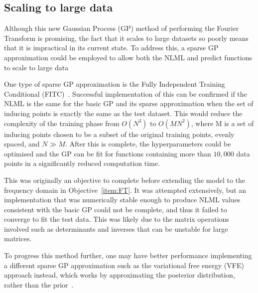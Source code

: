 \documentclass[12pt]{article}
\begin{document}
    \subsection{Scaling to large data}
    Although this new Gaussian Process (GP) method of performing the Fourier Transform is promising, the fact that it scales to large datasets so poorly means that it is impractical in its current state.
    To address this, a sparse GP approximation could be employed to allow both the NLML and predict functions to scale to large data

    One type of sparse GP approximation is the Fully Independent Training Conditional (FITC)~\cite{q-candela}.
    Successful implementation of this can be confirmed if the NLML is the same for the basic GP and its sparse approximation when the set of inducing points is exactly the same as the test dataset.
    This would reduce the complexity of the training phase from $O(N^3)$ to $O(MN^2)$, where M is a set of inducing points chosen to be a subset of the original training points, evenly spaced, and $N \gg M$. 
    After this is complete, the hyperparameters could be optimised and the GP can be fit for functions containing more than $10,000$ data points in a significantly reduced computation time.

     This was originally an objective to complete before extending the model to the frequency domain in Objective~\ref{item:FT}.
    It was attempted extensively, but an implementation that was numerically stable enough to produce NLML values consistent with the basic GP could not be complete, and thus it failed to converge to fit the test data.
    This was likely due to the matrix operations involved such as determinants and inverses that can be unstable for large matrices.

    To progress this method further, one may have better performance implementing a different sparse GP approximation such as the variational free energy (VFE) approach instead, which works by approximating the posterior distribution, rather than the prior~\cite{murphy2023probabilistic}.

\end{document}

